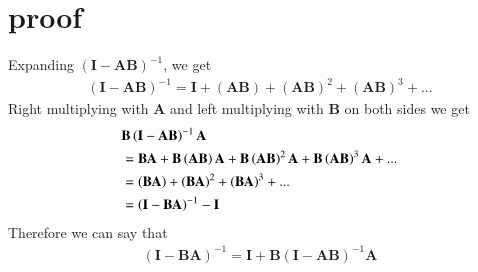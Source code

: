 \documentclass[journal,12pt,twocolumn]{IEEEtran}
\providecommand{\brak}[1]{\ensuremath{\left(#1\right)}}
\numberwithin{equation}{subsection}
\let\vec\mathbf
\begin{document}
\section{proof}
Expanding $\brak{\vec{I}-\vec{A}\vec{B}}^{-1}$, we get
\begin{align}
    \brak{\vec{I}-\vec{A}\vec{B}}^{-1}=\vec{I}+\brak{\vec{AB}}+\brak{\vec{AB}}^2+\brak{\vec{AB}}^3+...
\end{align}
Right multiplying with $\vec{A}$ and left multiplying with $\vec{B}$ on both sides we get
\begin{align}
    &\vec{B}\brak{\vec{I}-\vec{A}\vec{B}}^{-1}\vec{A}\notag\\
    &=\vec{BA}+\vec{B}\brak{\vec{AB}}\vec{A}+\vec{B}\brak{\vec{AB}}^2\vec{A}+\vec{B}\brak{\vec{AB}}^3\vec{A}+...\\
    &=\brak{\vec{BA}}+\brak{\vec{BA}}^2+\brak{\vec{BA}}^3+...\\
    &=\brak{\vec{I}-\vec{BA}}^{-1}-\vec{I}
\end{align}
Therefore we can say that
\begin{align}
    \brak{\vec{I}-\vec{BA}}^{-1}=\vec{I}+\vec{B}\brak{\vec{I}-\vec{A}\vec{B}}^{-1}\vec{A}
\end{align}
\end{document}
